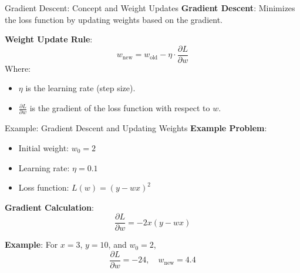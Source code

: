 \documentclass[serif, aspectratio=169]{beamer}
\begin{document}


\begin{frame}{Gradient Descent: Concept and Weight Updates}
    \textbf{Gradient Descent}: Minimizes the loss function by updating weights based on the gradient.

    \textbf{Weight Update Rule}:
    \[
    w_{\text{new}} = w_{\text{old}} - \eta \cdot \frac{\partial L}{\partial w}
    \]
    Where:
    \begin{itemize}
        \item \( \eta \) is the learning rate (step size).
        \item \( \frac{\partial L}{\partial w} \) is the gradient of the loss function with respect to \( w \).
    \end{itemize}
\end{frame}

\begin{frame}{Example: Gradient Descent and Updating Weights}
    \textbf{Example Problem}:
    \begin{itemize}
        \item Initial weight: \( w_0 = 2 \)
        \item Learning rate: \( \eta = 0.1 \)
        \item Loss function: \( L(w) = (y - wx)^2 \)
    \end{itemize}
    
    \textbf{Gradient Calculation}:
    \[
    \frac{\partial L}{\partial w} = -2x(y - wx)
    \]
    
    \textbf{Example}: For \( x = 3 \), \( y = 10 \), and \( w_0 = 2 \),
    \[
    \frac{\partial L}{\partial w} = -24, \quad w_{\text{new}} = 4.4
    \]
\end{frame}
\end{document}
